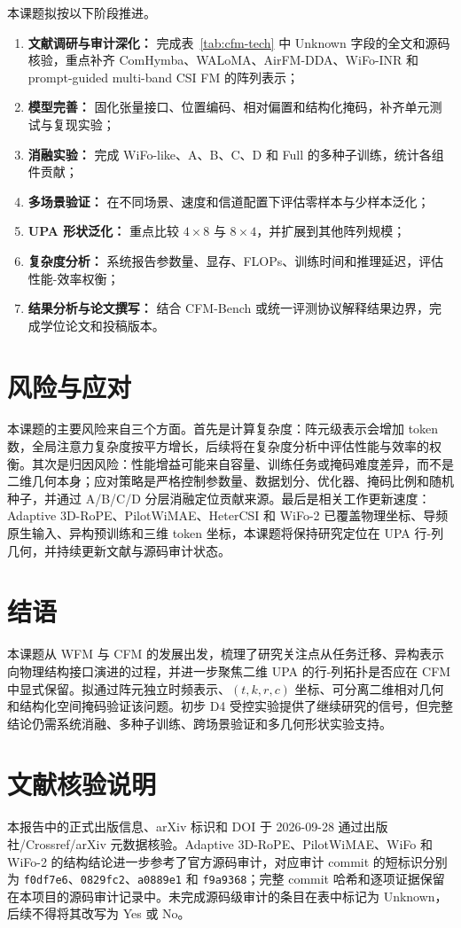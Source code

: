 \documentclass[journal]{IEEEtran}
\begin{document}
本课题拟按以下阶段推进。
\begin{enumerate}
\item \textbf{文献调研与审计深化：} 完成表~\ref{tab:cfm-tech} 中 Unknown 字段的全文和源码核验，重点补齐 ComHymba、WALoMA、AirFM-DDA、WiFo-INR 和 prompt-guided multi-band CSI FM 的阵列表示；
\item \textbf{模型完善：} 固化张量接口、位置编码、相对偏置和结构化掩码，补齐单元测试与复现实验；
\item \textbf{消融实验：} 完成 WiFo-like、A、B、C、D 和 Full 的多种子训练，统计各组件贡献；
\item \textbf{多场景验证：} 在不同场景、速度和信道配置下评估零样本与少样本泛化；
\item \textbf{UPA 形状泛化：} 重点比较 \(4\times8\) 与 \(8\times4\)，并扩展到其他阵列规模；
\item \textbf{复杂度分析：} 系统报告参数量、显存、FLOPs、训练时间和推理延迟，评估性能-效率权衡；
\item \textbf{结果分析与论文撰写：} 结合 CFM-Bench 或统一评测协议解释结果边界，完成学位论文和投稿版本。
\end{enumerate}

\section{风险与应对}

本课题的主要风险来自三个方面。首先是计算复杂度：阵元级表示会增加 token 数，全局注意力复杂度按平方增长，后续将在复杂度分析中评估性能与效率的权衡。其次是归因风险：性能增益可能来自容量、训练任务或掩码难度差异，而不是二维几何本身；应对策略是严格控制参数量、数据划分、优化器、掩码比例和随机种子，并通过 A/B/C/D 分层消融定位贡献来源。最后是相关工作更新速度：Adaptive 3D-RoPE、PilotWiMAE、HeterCSI 和 WiFo-2 已覆盖物理坐标、导频原生输入、异构预训练和三维 token 坐标，本课题将保持研究定位在 UPA 行-列几何，并持续更新文献与源码审计状态。

\section{结语}

本课题从 WFM 与 CFM 的发展出发，梳理了研究关注点从任务迁移、异构表示向物理结构接口演进的过程，并进一步聚焦二维 UPA 的行-列拓扑是否应在 CFM 中显式保留。拟通过阵元独立时频表示、\((t,k,r,c)\) 坐标、可分离二维相对几何和结构化空间掩码验证该问题。初步 D4 受控实验提供了继续研究的信号，但完整结论仍需系统消融、多种子训练、跨场景验证和多几何形状实验支持。

\section*{文献核验说明}

本报告中的正式出版信息、arXiv 标识和 DOI 于 2026-09-28 通过出版社/Crossref/arXiv 元数据核验。Adaptive 3D-RoPE、PilotWiMAE、WiFo 和 WiFo-2 的结构结论进一步参考了官方源码审计，对应审计 commit 的短标识分别为 \texttt{f0df7e6}、\texttt{0829fc2}、\texttt{a0889e1} 和 \texttt{f9a9368}；完整 commit 哈希和逐项证据保留在本项目的源码审计记录中。未完成源码级审计的条目在表中标记为 Unknown，后续不得将其改写为 Yes 或 No。



\end{document}
